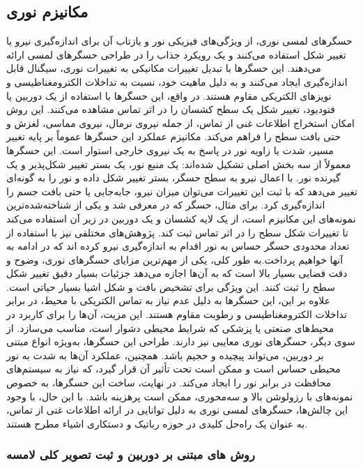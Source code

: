 \subsection{مکانیزم نوری}
حسگرهای لمسی نوری، از ویژگی‌های فیزیکی نور و یازتاب آن برای اندازه‌گیری نیرو یا تغییر شکل استفاده می‌کنند و یک رویکرد جذاب را در طراحی حسگرهای لمسی ارائه می‌دهند. این حسگرها با تبدیل تغییرات مکانیکی به تغییرات نوری، سیگنال قابل اندازه‌گیری ایجاد می‌کنند و به دلیل ماهیت خود، نسبت به تداخلات الکترومغناطیسی و نویزهای الکتریکی مقاوم هستند. در واقع، این حسگرها با استفاده از یک دوربین یا فتودیود، تغییر شکل یک سطح کشسان را در اثر تماس مشاهده می‌کنند. این روش امکان استخراج اطلاعات غنی از تماس، از جمله نیروی نرمال، نیروی مماسی، لغزش و حتی بافت سطح را فراهم می‌کند.
مکانیزم عملکرد این حسگرها عموماً بر پایه تغییر مسیر، شدت یا زاویه نور در پاسخ به یک نیروی خارجی استوار است. این حسگرها معمولاً از سه بخش اصلی تشکیل شده‌اند: یک منبع نور، یک بستر تغییر شکل‌پذیر و یک گیرنده نور. با اعمال نیرو به سطح حسگر، بستر تغییر شکل داده و نور را به گونه‌ای تغییر می‌دهد که با ثبت این تغییرات می‌توان میزان نیرو، جابه‌جایی یا حتی بافت جسم را اندازه‌گیری کرد. برای مثال، حسگر 
 که در 
\cite{yuan2017gelsight}
 معرفی شد و یکی از شناخته‌شده‌ترین نمونه‌های این مکانیزم است، از یک لایه کشسان و یک دوربین در زیر آن استفاده می‌کند تا تغییرات شکل سطح را در اثر تماس ثبت کند. پژوهش‌های مختلفی نیز با استفاده از تعداد محدودی حسگر حساس به نور اقدام به اندازه‌گیری نیرو کرده اند که در ادامه به آنها خواهیم پرداخت.به طور کلی، یکی از مهم‌ترین مزایای حسگرهای نوری، وضوح و دقت فضایی بسیار بالا است که به آن‌ها اجازه می‌دهد جزئیات بسیار دقیق تغییر شکل سطح را ثبت کنند. این ویژگی برای تشخیص بافت و شکل اشیا بسیار حیاتی است. علاوه بر این، این حسگرها به دلیل عدم نیاز به تماس الکتریکی با محیط، در برابر تداخلات الکترومغناطیسی و رطوبت مقاوم هستند. این مزیت، آن‌ها را برای کاربرد در محیط‌های صنعتی یا پزشکی که شرایط محیطی دشوار است، مناسب می‌سازد. از سوی دیگر، حسگرهای نوری معایبی نیز دارند. طراحی این حسگرها، به‌ویژه انواع مبتنی بر دوربین، می‌تواند پیچیده و حجیم باشد. همچنین، عملکرد آن‌ها به شدت به نور محیطی حساس است و ممکن است تحت تأثیر آن قرار گیرد، که نیاز به سیستم‌های محافظت در برابر نور را ایجاد می‌کند. در نهایت، ساخت این حسگرها، به خصوص نمونه‌های با رزولوشن بالا و سه‌محوری، ممکن است پرهزینه باشد. با این حال، با وجود این چالش‌ها، حسگرهای لمسی نوری به دلیل توانایی در ارائه اطلاعات غنی از تماس، به عنوان یک راه‌حل کلیدی در حوزه رباتیک و دستکاری اشیاء مطرح هستند.
\subsubsection{روش های مبتنی بر دوربین و ثبت تصویر کلی لامسه}

